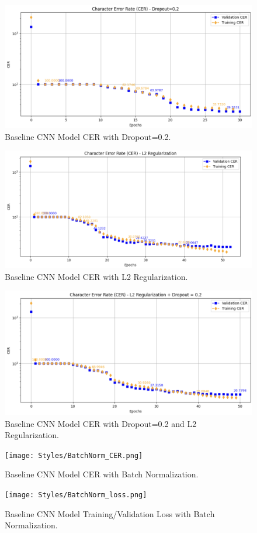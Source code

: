\documentclass{article}
\begin{document}
\begin{figure}[ht]
  \centering
  \includegraphics[width=0.8\linewidth]{Dropout0.2_CER.png} 
  \caption{Baseline CNN Model CER with Dropout=0.2.}
  \label{fig:dropout0.2_cer}
\end{figure}
\begin{figure}[ht]
  \centering
  \includegraphics[width=0.8\linewidth]{L2Reg_CER.png} 
  \caption{Baseline CNN Model CER with L2 Regularization.}
  \label{fig:L2_cer}
\end{figure}

\begin{figure}[ht]
  \centering
  \includegraphics[width=0.8\linewidth]{L2+Dropout0.2_CER.png} 
  \caption{Baseline CNN Model CER with Dropout=0.2 and L2 Regularization.}
  \label{fig:dropout0.2+L2_cer}
\end{figure}
\begin{figure}[ht]
      \centering
      \texttt{[image: Styles/BatchNorm\_CER.png]} 
      \caption{Baseline CNN Model CER with Batch Normalization.}
      \label{fig:Batchnorm_cer}
\end{figure}
\begin{figure}[ht]
      \centering
      \texttt{[image: Styles/BatchNorm\_loss.png]} 
      \caption{Baseline CNN Model Training/Validation Loss with Batch Normalization.}
      \label{fig:Batchnorm_loss}
\end{figure}
\end{document}

